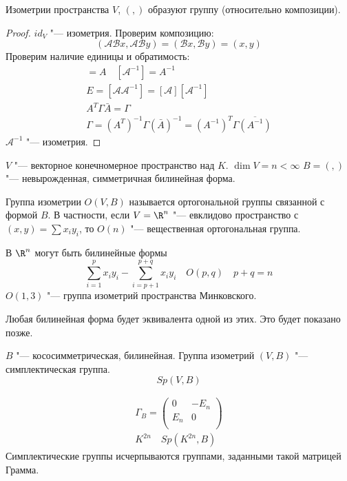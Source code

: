 \begin{conseq}
	Изометрии пространства $V$, $(,)$ образуют группу (относительно композиции).
\end{conseq}
\begin{proof}
	$id_V $  "--- изометрия.
	Проверим композицию:
	\[ (\mathcal A \mathcal B x, \mathcal A \mathcal B y) = (\mathcal B x, \mathcal B y) = (x, y) \]
	Проверим наличие единицы и обратимость:
	\begin{gather*}
		[\mathcal A ] = A \quad [\mathcal A ^{-1}] = A ^{-1} \\
		E = [\mathcal A \mathcal A ^{-1}] = [\mathcal A] [\mathcal A ^{-1}] \\
		A^T \Gamma \bar A  = \Gamma \\
		\Gamma = (A^T)^{-1} \Gamma (\bar A)^{-1} = (A^{-1})^T \Gamma \overline{(A^{-1})}
	\end{gather*}
	$\mathcal A^{-1}$ "--- изометрия.
\end{proof}

\begin{Def}
	$V$ "--- векторное конечномерное пространство над $K$. $\dim V = n < \infty$
	$B = (,)$ "--- невырожденная, симметричная билинейная форма.

	Группа изометрии $O(V, B)$ называется ортогональной группы связанной с формой $B$.
	В частности, если $V = \R^n$ "--- евклидово пространство с $(x, y) = \sum x_i y_i$,
	то $O(n)$ "--- вещественная ортогональная группа.
\end{Def}
В $\R^n$ могут быть билинейные формы
\[ \sum_{i = 1}^p x_iy_i - \sum_{i = p + 1}^{p + q} x_i y_i \quad O(p, q) \quad p + q = n \]
$O(1, 3)$ "--- группа изометрий пространства Минковского.

Любая билинейная форма будет эквивалента одной из этих.
Это будет показано позже.

\begin{Def}
	$B$ "--- кососимметрическая, билинейная.
	Группа изометрий $(V, B)$ "--- симплектическая группа.
	\[ Sp(V, B) \]
\end{Def}

\begin{exmp}
	\begin{gather*}
		\Gamma_B = \begin{pmatrix} 0 & -E_n \\ E_n & 0 \\ \end{pmatrix} \\
		K^{2n} \quad Sp(K^{2n}, B)
	\end{gather*}
	Симплектические группы исчерпываются группами, заданными такой матрицей Грамма.
\end{exmp}


